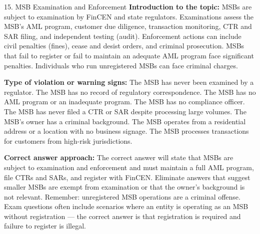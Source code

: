 \documentclass[11pt,a4paper]{beamer}
\begin{document}
\begin{frame}{15. MSB Examination and Enforcement}
\tiny
\noindent\textbf{Introduction to the topic:} MSBs are subject to examination by FinCEN and state regulators. Examinations assess the MSB's AML program, customer due diligence, transaction monitoring, CTR and SAR filing, and independent testing (audit). Enforcement actions can include civil penalties (fines), cease and desist orders, and criminal prosecution. MSBs that fail to register or fail to maintain an adequate AML program face significant penalties. Individuals who run unregistered MSBs can face criminal charges.

\vspace{0.1cm}
\noindent\textbf{Type of violation or warning signs:} The MSB has never been examined by a regulator. The MSB has no record of regulatory correspondence. The MSB has no AML program or an inadequate program. The MSB has no compliance officer. The MSB has never filed a CTR or SAR despite processing large volumes. The MSB's owner has a criminal background. The MSB operates from a residential address or a location with no business signage. The MSB processes transactions for customers from high-risk jurisdictions.

\vspace{0.1cm}
\noindent\textbf{Correct answer approach:} The correct answer will state that MSBs are subject to examination and enforcement and must maintain a full AML program, file CTRs and SARs, and register with FinCEN. Eliminate answers that suggest smaller MSBs are exempt from examination or that the owner's background is not relevant. Remember: unregistered MSB operations are a criminal offense. Exam questions often include scenarios where an entity is operating as an MSB without registration — the correct answer is that registration is required and failure to register is illegal.
\end{frame}
\end{document}
